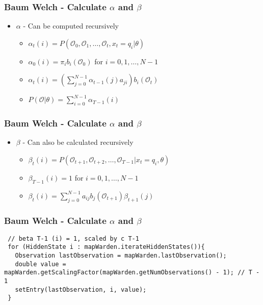 \begin{frame}
	\frametitle{Baum Welch - Calculate $\alpha$ and $\beta$}
	\begin{itemize}
		\item $\alpha$ - Can be computed recursively
		\begin{itemize}
			\item $\alpha_t(i) = P(\mathcal{O}_0, \mathcal{O}_1, \dots ,\mathcal{O}_t , x_t = q_i | \theta)$
			\item $\alpha_0(i) = \pi_i b_i(\mathcal{O}_0)$ for $i = 0, 1, \dots, N-1$
			\item $\alpha_t(i) = \left(\sum\limits_{j=0}^{N-1} \alpha_{t-1}(j)a_{ji}\right)b_i(\mathcal{O}_t)$
			\item $P(\mathcal{O}|\theta) = \sum\limits_{i=0}^{N-1} \alpha_{T-1}(i)$
		\end{itemize}
	\end{itemize}
\end{frame}

\begin{frame}
	\frametitle{Baum Welch - Calculate $\alpha$ and $\beta$}
	\begin{itemize}
		\item $\beta$ - Can also be calculated recursively
		\begin{itemize}
			\item $\beta_t(i) = P(\mathcal{O}_{t+1}, \mathcal{O}_{t+2}, \dots, \mathcal{O}_{T-1} | x_t = q_i, \theta)$
			\item $\beta_{T-1}(i) = 1$ for $i = 0, 1, \dots, N-1$
			\item $\beta_t(i) = \sum\limits_{j=0}^{N-1} a_{ij} b_j(\mathcal{O}_{t+1}) \beta_{t+1}(j)$
		\end{itemize}
	\end{itemize}
\end{frame}

\begin{frame}[fragile]
	\frametitle{Baum Welch - Calculate $\alpha$ and $\beta$}
	\begin{lstlisting}    
 // beta T-1 (i) = 1, scaled by c T-1
 for (HiddenState i : mapWarden.iterateHiddenStates()){
   Observation lastObservation = mapWarden.lastObservation();
   double value = mapWarden.getScalingFactor(mapWarden.getNumObservations() - 1); // T - 1
   setEntry(lastObservation, i, value);
 }
	\end{lstlisting}
\end{frame}

